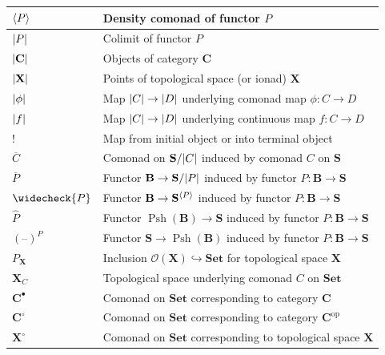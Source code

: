 \documentclass[11pt, oneside, article]{memoir}
\theoremstyle{plain}
\theoremstyle{definition}
\theoremstyle{remark}
\DeclareMathOperator{\Psh}{Psh}
\DeclareMathOperator{\Lan}{Lan}
\DeclareMathOperator{\ophelper}{op}
\DeclarePairedDelimiter{\gen}{\langle}{\rangle}
\DeclarePairedDelimiter{\abs}{\lvert}{\rvert}
\newcommand{\dash}{{\mathord{\text{--}}}}
\newcommand{\op}{^{\ophelper}}
\newcommand{\bang}{\mathrm{!}}
\newcommand{\namedcat}[1]{\mathbf{#1}}
\newcommand{\cat}[1]{\mathbf{#1}}
\newcommand{\spa}[1]{\mathbf{#1}}
\newcommand{\Set}{\namedcat{Set}}
\newcommand{\CoalgOn}[2]{{#2}^{#1}}
\newcommand{\CoalgS}[1]{\CoalgOn{#1}{\bS}}
\newcommand{\clift}[1]{\overline{#1}}
\newcommand{\pts}[1]{{\abs{#1}}}
\newcommand{\one}[1]{\pts{#1}}
\newcommand{\lift}[1]{\widecheck{#1}}
\newcommand{\ptlift}[1]{\overline{#1}}
\newcommand{\extend}[1]{\widehat{#1}}
\newcommand{\nerve}[1]{(\dash)^{#1}}
\newcommand{\ph}[1]{#1}
\newcommand{\topbasis}[1]{\pP_{#1}}
\newcommand{\Ps}[1]{\Psh(#1)}
\newcommand{\cmnd}[1]{{#1}}
\newcommand{\cC}{\cmnd{C}}
\newcommand{\cD}{\cmnd{D}}
\newcommand{\bB}{\cat{B}}
\newcommand{\bC}{\cat{C}}
\newcommand{\bS}{\cat{S}}
\newcommand{\pP}{\ph{P}}
\newcommand{\cP}{\gen{\pP}}
\newcommand{\lP}{\lift{\pP}}
\newcommand{\tX}{\spa{X}}
\newcommand{\cX}{\toptocmd{\tX}}
\newcommand{\cbC}{\cattocmd{\bC}}
\newcommand{\PS}{\CoalgS{\cP}}
\newcommand{\La}[2]{\Lan_{#1}#2}
\newcommand{\cattocmd}[1]{{{#1}^\bullet}}
\newcommand{\cattocmdp}[1]{{{#1}^\circ}}
\newcommand{\toptocmd}[1]{{{#1}^\circ}}
\newcommand{\cmdtotop}[1]{{\tX_{#1}}}
\newcommand{\opens}[1]{\mathcal{O}(#1)}
\begin{document}
\setcounter{table}{1}
\begin{center}
  \renewcommand{\arraystretch}{1.5}%
  \begin{tabular}{|>{\centering\arraybackslash}p{4em}|>{\centering\arraybackslash}p{30em}|}
    \hline
    $\cP$ & Density comonad of functor $\pP$ \\
    \hline
    $\pts{\pP}$ & Colimit of functor $\pP$ \\
    \hline
    $\pts{\bC}$ & Objects of category $\bC$ \\
    \hline
    $\pts{\tX}$ & Points of topological space (or ionad) $\tX$ \\
    \hline
    $\one{\phi}$ & Map $\pts{\cC} \to \pts{\cD}$ underlying comonad map $\phi \colon \cC \to \cD$ \\
    \hline
    $\one{f}$ & Map $\pts{\cC} \to \pts{\cD}$ underlying continuous map $f \colon \cC \to \cD$ \\
    \hline
    $\bang$ & Map from initial object or into terminal object \\
    \hline
    $\clift{\cC}$ & Comonad on $\bS/\pts{\cC}$ induced by comonad $\cC$ on $\bS$\\
    \hline
    $\ptlift{\pP}$ & Functor $\bB \to \bS/\pts{\pP}$ induced by functor $\pP \colon \bB \to \bS$\\
    \hline
    $\lP$ & Functor $\bB \to \PS$ induced by functor $\pP \colon \bB \to \bS$\\
    \hline
    $\extend{\pP}$ & Functor $\Ps{\bB} \to \bS$ induced by functor $\pP \colon \bB \to \bS$\\
    \hline
    $\nerve{\pP}$ & Functor $\bS \to \Ps{\bB}$ induced by functor $\pP \colon \bB \to \bS$\\
    \hline
    $\topbasis{\tX}$ & Inclusion $\opens{\tX} \hookrightarrow \Set$ for topological space $\tX$\\
    \hline
    $\cmdtotop{\cC}$ & Topological space underlying comonad $\cC$ on $\Set$ \\
    \hline
    $\cbC$ & Comonad on $\Set$ corresponding to category $\bC$ \\
    \hline
    $\cattocmdp{\bC}$ & Comonad on $\Set$ corresponding to category $\bC\op$ \\
    \hline
    $\cX$ & Comonad on $\Set$ corresponding to topological space $\tX$ \\
    \hline

\end{tabular}
\end{center}
\end{document}

